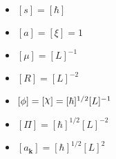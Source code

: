 \begin{itemize}
	\item $[s]=[\hbar]$
	\item $[a]=[\xi]=1$
	\item $[\mu]=[L]^{-1}$
	\item $[R]=[L]^{-2}$
	\item $[\phi]=[\rchi]=[\hbar]^{1/2}[L]^{-1}$
	\item $[\Pi]=[\hbar]^{1/2}[L]^{-2}$
	\item $[a_\mathbf{k}]=[\hbar]^{1/2}[L]^2$
\end{itemize}